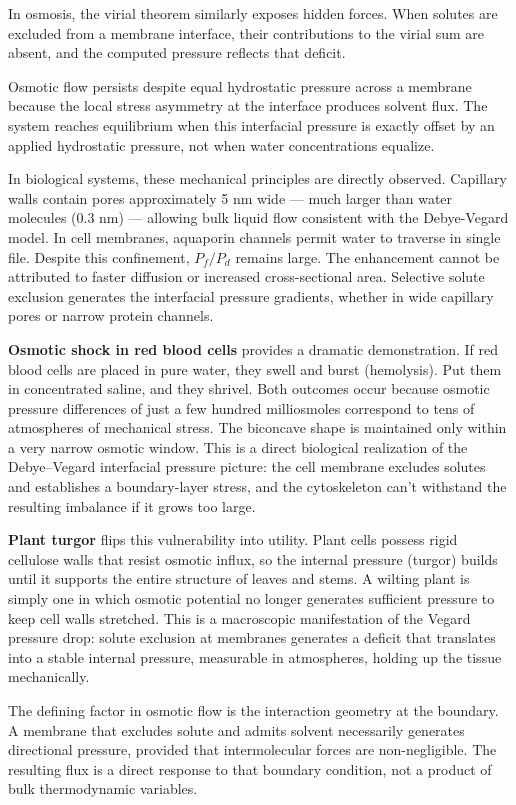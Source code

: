 In osmosis, the virial theorem similarly exposes hidden forces. When solutes are excluded from a membrane interface, their contributions to the virial sum are absent, and the computed pressure reflects that deficit.

Osmotic flow persists despite equal hydrostatic pressure across a membrane because the local stress asymmetry at the interface produces solvent flux. The system reaches equilibrium when this interfacial pressure is exactly offset by an applied hydrostatic pressure, not when water concentrations equalize.

In biological systems, these mechanical principles are directly observed. Capillary walls contain pores approximately 5 nm wide — much larger than water molecules (0.3 nm) — allowing bulk liquid flow consistent with the Debye-Vegard model. In cell membranes, aquaporin channels permit water to traverse in single file. Despite this confinement, $P_f / P_d$ remains large. The enhancement cannot be attributed to faster diffusion or increased cross-sectional area. Selective solute exclusion generates the interfacial pressure gradients, whether in wide capillary pores or narrow protein channels.

\textbf{Osmotic shock in red blood cells} provides a dramatic demonstration. If red blood cells are placed in pure water, they swell and burst (hemolysis). Put them in concentrated saline, and they shrivel. Both outcomes occur because osmotic pressure differences of just a few hundred milliosmoles correspond to tens of atmospheres of mechanical stress. The biconcave shape is maintained only within a very narrow osmotic window. This is a direct biological realization of the Debye–Vegard interfacial pressure picture: the cell membrane excludes solutes and establishes a boundary-layer stress, and the cytoskeleton can't withstand the resulting imbalance if it grows too large.

\textbf{Plant turgor} flips this vulnerability into utility. Plant cells possess rigid cellulose walls that resist osmotic influx, so the internal pressure (turgor) builds until it supports the entire structure of leaves and stems. A wilting plant is simply one in which osmotic potential no longer generates sufficient pressure to keep cell walls stretched. This is a macroscopic manifestation of the Vegard pressure drop: solute exclusion at membranes generates a deficit that translates into a stable internal pressure, measurable in atmospheres, holding up the tissue mechanically.

The defining factor in osmotic flow is the interaction geometry at the boundary. A membrane that excludes solute and admits solvent necessarily generates directional pressure, provided that intermolecular forces are non-negligible. The resulting flux is a direct response to that boundary condition, not a product of bulk thermodynamic variables.

